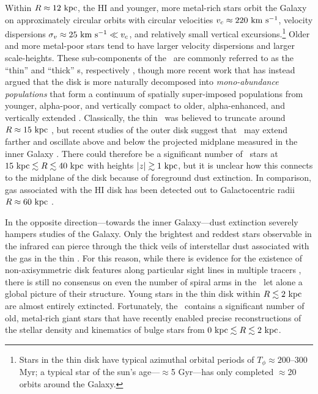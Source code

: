 Within $R\approx 12~\mathrm{kpc}$, the HI and younger, more metal-rich stars orbit the Galaxy on approximately circular orbits with circular velocities $v_c \approx 220~\mathrm{km}~\mathrm{s}^{-1}$, velocity dispersions $\sigma_v \approx 25~\mathrm{km}~\mathrm{s}^{-1} \ll v_c$, and relatively small vertical excursions.\footnote{Stars in the thin disk have typical azimuthal orbital periods of $T_\phi \approx 200$--300 Myr; a typical star of the sun's age---$\approx$5 Gyr---has only completed $\approx$20 orbits around the Galaxy.} Older and more metal-poor stars tend to have larger velocity dispersions and larger scale-heights. These sub-components of the \mwdisk\ are commonly referred to as the ``thin'' and ``thick'' \mwdisk s, respectively \citep{gilmore83}, though more recent work that has instead argued that the disk is more naturally decomposed into \emph{mono-abundance populations} that form a continuum of spatially super-imposed populations from younger, alpha-poor, and vertically compact to older, alpha-enhanced, and vertically extended \citep[see, e.g., Figure~12 and Section~6 in][]{rixbovy13, bovy12-nothickdisk}. Classically, the thin \mwdisk\ was believed to truncate around $R \approx 15~\mathrm{kpc}$ \citep[e.g.,][]{robin92}, but recent studies of the outer disk suggest that \mwdisk\ may extend farther and oscillate above and below the projected midplane measured in the inner Galaxy \citep{xu15, apw15-triand}. There could therefore be a significant number of \mwdisk\ stars at $15~\mathrm{kpc} \lesssim R \lesssim 40~\mathrm{kpc}$ with heights $|z| \gtrsim 1~\mathrm{kpc}$, but it is unclear how this connects to the midplane of the disk because of foreground dust extinction. In comparison, gas associated with the HI disk has been detected out to Galactocentric radii $R \approx 60~\mathrm{kpc}$ \citep{kalberla08}.

In the opposite direction---towards the inner Galaxy---dust extinction severely hampers studies of the Galaxy. Only the brightest and reddest stars observable in the infrared can pierce through the thick veils of interstellar dust associated with the gas in the thin \mwdisk. For this reason, while there is evidence for the existence of non-axisymmetric disk features along particular sight lines in multiple tracers \citep[e.g.,][]{levine06, reid14}, there is still no consensus on even the number of spiral arms in the \mwdisk\ let alone a global picture of their structure. Young stars in the thin disk within $R \lesssim 2~\mathrm{kpc}$ are almost entirely extincted. Fortunately, the \mwbulge\ contains a significant number of old, metal-rich giant stars that have recently enabled precise reconstructions of the stellar density and kinematics of bulge stars from $0~\mathrm{kpc} \lesssim R \lesssim 2~\mathrm{kpc}$.


